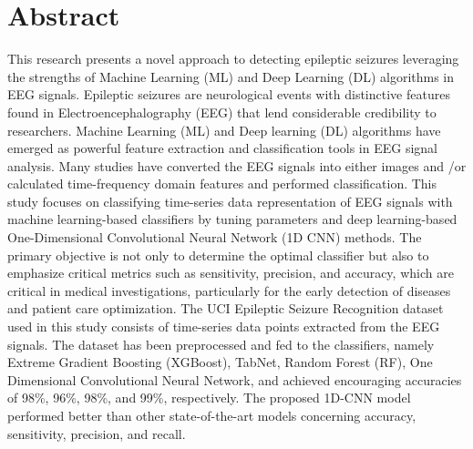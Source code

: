 \chapter*{Abstract}%
%

This research presents a novel approach to detecting epileptic seizures leveraging the strengths of Machine Learning (ML) and Deep Learning (DL) algorithms in EEG signals. Epileptic seizures are neurological events with distinctive features found in Electroencephalography (EEG) that lend considerable credibility to researchers. Machine Learning (ML) and Deep learning (DL) algorithms have emerged as powerful feature extraction and classification tools in EEG signal analysis. Many studies have converted the EEG signals into either images and /or calculated time-frequency domain features and performed classification. This study focuses on classifying time-series data representation of EEG signals with machine learning-based classifiers by tuning parameters and deep learning-based One-Dimensional Convolutional Neural Network (1D CNN) methods. The primary objective is not only to determine the optimal classifier but also to emphasize critical metrics such as sensitivity, precision, and accuracy, which are critical in medical investigations, particularly for the early detection of diseases and patient care optimization. The UCI Epileptic Seizure Recognition dataset used in this study consists of time-series data points extracted from the EEG signals. The dataset has been preprocessed and fed to the classifiers, namely Extreme Gradient Boosting (XGBoost), TabNet, Random Forest (RF), One Dimensional Convolutional Neural Network, and achieved encouraging accuracies of 98\%, 96\%, 98\%, and 99\%, respectively. The proposed 1D-CNN model performed better than other state-of-the-art models concerning accuracy, sensitivity, precision, and recall. \\


\thispagestyle{plain}

